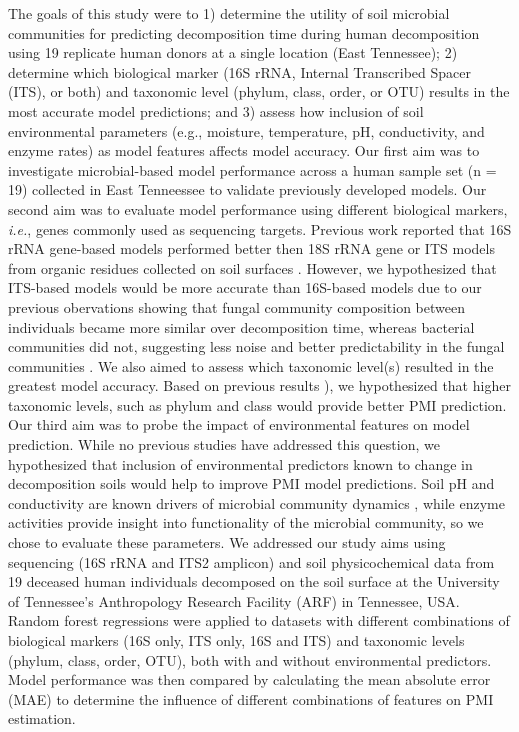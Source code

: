\documentclass[
  10pt,
  letterpaper,
]{article}
\begin{document}
The goals of this study were to 1) determine the utility of soil
microbial communities for predicting decomposition time during human
decomposition using 19 replicate human donors at a single location (East
Tennessee); 2) determine which biological marker (16S rRNA, Internal
Transcribed Spacer (ITS), or both) and taxonomic level (phylum, class,
order, or OTU) results in the most accurate model predictions; and 3)
assess how inclusion of soil environmental parameters (e.g., moisture,
temperature, pH, conductivity, and enzyme rates) as model features
affects model accuracy. Our first aim was to investigate microbial-based
model performance across a human sample set (n = 19) collected in East
Tenneessee to validate previously developed models. Our second aim was
to evaluate model performance using different biological markers,
\emph{i.e.}, genes commonly used as sequencing targets. Previous work
reported that 16S rRNA gene-based models performed better then 18S rRNA
gene or ITS models from organic residues collected on soil surfaces
\citep{belk_microbiome_2018, burcham_conserved_2024}. However, we
hypothesized that ITS-based models would be more accurate than 16S-based
models due to our previous obervations showing that fungal community
composition between individuals became more similar over decomposition
time, whereas bacterial communities did not, suggesting less noise and
better predictability in the fungal communities \citep{mason_body_2022}.
We also aimed to assess which taxonomic level(s) resulted in the
greatest model accuracy. Based on previous results
\citep{belk_microbiome_2018, mason_body_2022}), we hypothesized that
higher taxonomic levels, such as phylum and class would provide better
PMI prediction. Our third aim was to probe the impact of environmental
features on model prediction. While no previous studies have addressed
this question, we hypothesized that inclusion of environmental
predictors known to change in decomposition soils would help to improve
PMI model predictions. Soil pH and conductivity are known drivers of
microbial community dynamics
\citep{lauber_pyrosequencing-based_2009, rath_linking_2019}, while
enzyme activities provide insight into functionality of the microbial
community, so we chose to evaluate these parameters. We addressed our
study aims using sequencing (16S rRNA and ITS2 amplicon) and soil
physicochemical data from 19 deceased human individuals
\citep{mason_body_2022} decomposed on the soil surface at the University
of Tennessee's Anthropology Research Facility (ARF) in Tennessee, USA.
Random forest regressions were applied to datasets with different
combinations of biological markers (16S only, ITS only, 16S and ITS) and
taxonomic levels (phylum, class, order, OTU), both with and without
environmental predictors. Model performance was then compared by
calculating the mean absolute error (MAE) to determine the influence of
different combinations of features on PMI estimation.
\end{document}
